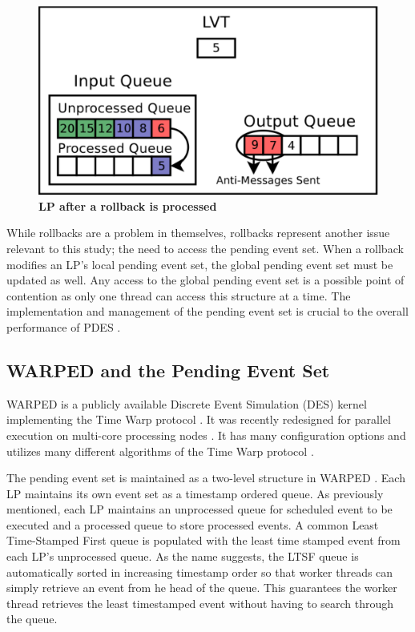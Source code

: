 \documentclass[a4paper]{article}
\begin{document}
\begin{figure}[H]
    \centering
    \graphicspath{ {./figures/} }
    \includegraphics[width=\textwidth,height=\textheight,keepaspectratio]{rollback_processed}
    \caption{\textbf{LP after a rollback is processed}}
    \label{fig:rollback_processed}
\end{figure}

While rollbacks are a problem in themselves, rollbacks represent another issue
relevant to this study; the need to access the pending event set.  When a
rollback modifies an LP's local pending event set, the global pending event set
must be updated as well.  Any access to the global pending event set is a
possible point of contention as only one thread can access this structure at a
time.  The implementation and management of the pending event set is crucial to
the overall performance of PDES \cite{twpes}.  

\subsection{\textbf{WARPED and the Pending Event Set}}

WARPED is a publicly available Discrete Event Simulation (DES) kernel
implementing the Time Warp protocol \cite{martin,fujimoto}.  It was recently
redesigned for parallel execution on multi-core processing nodes
\cite{muthalagu}.  It has many configuration options and utilizes many different
algorithms of the Time Warp protocol \cite{fujimoto}.
\par

The pending event set is maintained as a two-level structure in WARPED
\cite{dickman}.  Each LP maintains its own event set as a timestamp ordered
queue.  As previously mentioned, each LP maintains an unprocessed queue for
scheduled event to be executed and a processed queue to store processed events.  
A common Least Time-Stamped First queue is populated with the least time
stamped event from each LP's unprocessed queue.  As the name suggests, the LTSF
queue is automatically sorted in increasing timestamp order so that worker
threads can simply retrieve an event from he head of the queue.  This guarantees
the worker thread retrieves the least timestamped event without having to
search through the queue.  \par
\end{document}
